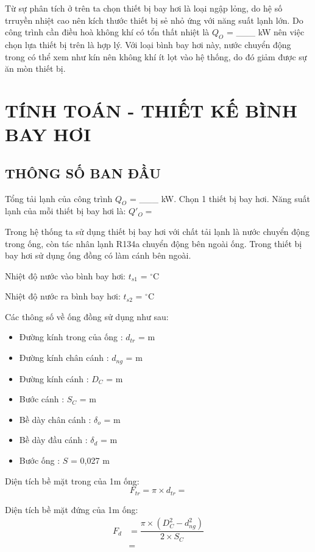Từ sự phân tích ở trên ta chọn thiết bị bay hơi là loại ngập lỏng, do hệ số trruyền nhiệt cao nên kích thước thiết bị sẻ nhỏ ứng với năng suất lạnh lớn. Do công trình cần điều hoà không khí có tổn thất nhiệt là $Q_{O}$ = \_\_\_ kW nên việc chọn lựa thiết bị trên là hợp lý. Với loại bình bay hơi này, nước chuyển động trong có thể xem như kín nên không khí ít lọt vào hệ thống, do đó giảm được sự ăn mòn thiết bị.

\section{TÍNH TOÁN - THIẾT KẾ BÌNH BAY HƠI}
\subsection{THÔNG SỐ BAN ĐẦU}
Tổng tải lạnh của công trình $Q_{O}$ = \_\_\_ kW. Chọn 1 thiết bị bay hơi. Năng suất lạnh của mỗi thiết bị bay hơi là: $Q'_{O} = $

Trong hệ thống ta sử dụng thiết bị bay hơi với chất tải lạnh là nước chuyển động trong ống, còn tác nhân lạnh R134a chuyển động bên ngoài ống. Trong thiết bị bay hơi sử dụng ống đồng có làm cánh bên ngoài.

Nhiệt độ nước vào bình bay hơi: $t_{s1}$ = $^{\circ}$C

Nhiệt độ nước ra bình bay hơi: $t_{s2}$ = $^{\circ}$C

Các thông số về ống đồng sử dụng như sau:
\begin{itemize}
	\item Đường kính trong của ống : $ d_{tr} $ =  m
	\item Đường kính chân cánh : $ d_{ng} $ =  m
	\item Đường kính cánh : $D_{C}$ =  m
	\item Bước cánh : $ S_{C} $ =  m
	\item Bề dày chân cánh : $ \delta_{o} $ =  m
	\item Bề dày đầu cánh : $ \delta_{d} $ = m
	\item Bước ống : $S$ = 0,027 m
\end{itemize}

Diện tích bề mặt trong của 1m ống:
\begin{equation*}
	F_{tr} = \pi\times d_{tr} = 
\end{equation*}

Diện tích bề mặt đứng của 1m ống:
\begin{equation*}
	\begin{split}
		F_{d} &= \dfrac{\pi\times(D_{C}^2 - d_{ng}^2)}{2\times S_{C}}\\
		&= 
	\end{split}
\end{equation*}


